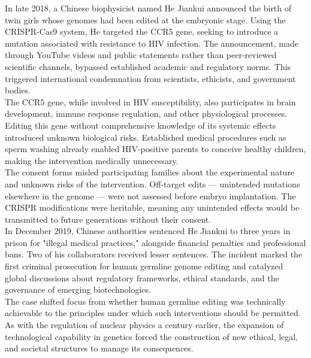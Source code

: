 \begin{shadedstory}

In late 2018, a Chinese biophysicist named He Jiankui announced the birth of twin girls whose genomes had been edited at the embryonic stage. Using the CRISPR-Cas9 system, He targeted the CCR5 gene, seeking to introduce a mutation associated with resistance to HIV infection. The announcement, made through YouTube videos and public statements rather than peer-reviewed scientific channels, bypassed established academic and regulatory norms. This triggered international condemnation from scientists, ethicists, and government bodies.\\

The CCR5 gene, while involved in HIV susceptibility, also participates in brain development, immune response regulation, and other physiological processes. Editing this gene without comprehensive knowledge of its systemic effects introduced unknown biological risks. Established medical procedures such as sperm washing already enabled HIV-positive parents to conceive healthy children, making the intervention medically unnecessary.\\

 The consent forms misled participating families about the experimental nature and unknown risks of the intervention. Off-target edits — unintended mutations elsewhere in the genome — were not assessed before embryo implantation. The CRISPR modifications were heritable, meaning any unintended effects would be transmitted to future generations without their consent.\\

In December 2019, Chinese authorities sentenced He Jiankui to three years in prison for "illegal medical practices," alongside financial penalties and professional bans. Two of his collaborators received lesser sentences. The incident marked the first criminal prosecution for human germline genome editing and catalyzed global discussions about regulatory frameworks, ethical standards, and the governance of emerging biotechnologies.\\

The case shifted focus from whether human germline editing was technically achievable to the principles under which such interventions should be permitted. As with the regulation of nuclear physics a century earlier, the expansion of technological capability in genetics forced the construction of new ethical, legal, and societal structures to manage its consequences.

\end{shadedstory}
\vspace*{\fill}

